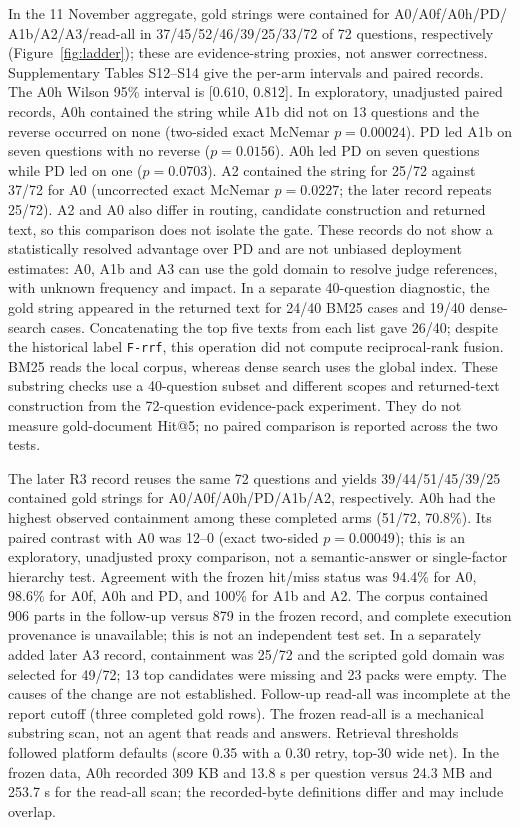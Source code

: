In the 11 November aggregate, gold strings were contained for A0/A0f/A0h/PD/
A1b/A2/A3/read-all in 37/45/52/46/39/25/33/72 of 72 questions, respectively
(Figure~\ref{fig:ladder}); these are evidence-string proxies, not answer
correctness. Supplementary Tables S12--S14 give the per-arm intervals and
paired records. The A0h Wilson 95\% interval is [0.610, 0.812]. In exploratory,
unadjusted paired records, A0h contained the string while A1b did not on 13
questions and the reverse occurred on none (two-sided exact McNemar
$p=0.00024$). PD led A1b on seven questions with no reverse
($p=0.0156$). A0h led PD on seven questions while PD led on one
($p=0.0703$). A2 contained the string for 25/72 against 37/72 for A0
(uncorrected exact McNemar $p=0.0227$; the later record repeats 25/72). A2 and
A0 also differ in routing, candidate construction and returned text, so this
comparison does not isolate the gate. These records do not show a statistically resolved advantage
over PD and are not unbiased deployment estimates: A0, A1b and A3 can use
the gold domain to resolve judge references, with unknown frequency and impact.
In a separate 40-question diagnostic, the gold string appeared in the
returned text for 24/40 BM25 cases and 19/40 dense-search cases. Concatenating
the top five texts from each list gave 26/40; despite the historical label
\texttt{F-rrf}, this operation did not compute reciprocal-rank fusion. BM25
reads the local corpus, whereas dense search uses the global index. These
substring checks use a 40-question subset and different scopes and returned-text
construction from the 72-question evidence-pack experiment. They do not measure
gold-document Hit@5; no paired comparison is reported across the two tests.

The later R3 record reuses the same 72 questions and yields
39/44/51/45/39/25 contained gold strings for A0/A0f/A0h/PD/A1b/A2,
respectively. A0h had the highest observed containment among these completed
arms (51/72, 70.8\%). Its paired contrast with A0 was 12--0 (exact two-sided
$p=0.00049$); this is an exploratory, unadjusted proxy comparison, not a
semantic-answer or single-factor hierarchy test. Agreement with the frozen
hit/miss status was 94.4\% for A0, 98.6\% for A0f, A0h and PD, and 100\%
for A1b and A2. The corpus contained 906 parts in the follow-up versus 879 in
the frozen record, and complete execution provenance is unavailable; this is
not an independent test set. In a separately added later A3 record,
containment was 25/72 and the scripted gold domain was selected for 49/72;
13 top candidates were missing and 23 packs were empty. The causes of the
change are not established. Follow-up read-all was incomplete at the report
cutoff (three completed gold rows). The frozen read-all is a mechanical
substring scan, not an agent that reads and answers. Retrieval thresholds
followed platform defaults (score 0.35 with a 0.30 retry, top-30 wide net).
In the frozen data, A0h recorded 309 KB and 13.8 s per question versus
24.3 MB and 253.7 s for the read-all scan; the recorded-byte definitions
differ and may include overlap.

